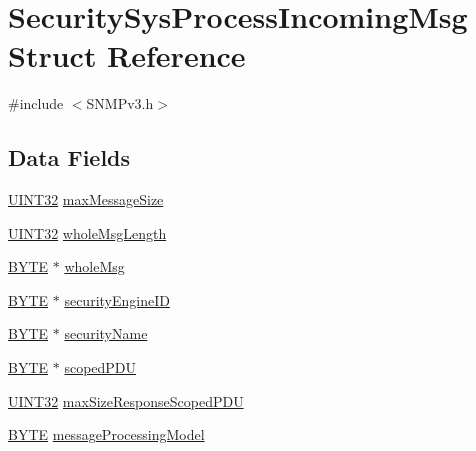 \hypertarget{struct_security_sys_process_incoming_msg}{}\section{Security\+Sys\+Process\+Incoming\+Msg Struct Reference}
\label{struct_security_sys_process_incoming_msg}


{\ttfamily \#include $<$S\+N\+M\+Pv3.\+h$>$}

\subsection*{Data Fields}
\begin{DoxyCompactItemize}
\item 
\hyperlink{_generic_type_defs_8h_a1720f33f59b583f0c2ed071815623a86}{U\+I\+N\+T32} \hyperlink{struct_security_sys_process_incoming_msg_a4bb188cbbe1cd83f7bba86b6ad7ab509}{max\+Message\+Size}
\item 
\hyperlink{_generic_type_defs_8h_a1720f33f59b583f0c2ed071815623a86}{U\+I\+N\+T32} \hyperlink{struct_security_sys_process_incoming_msg_ae69530a979f1b7b71b437d128ffc63ff}{whole\+Msg\+Length}
\item 
\hyperlink{_generic_type_defs_8h_a4ae1dab0fb4b072a66584546209e7d58}{B\+Y\+T\+E} $\ast$ \hyperlink{struct_security_sys_process_incoming_msg_a004e34c44705bf128556c60cca7a6586}{whole\+Msg}
\item 
\hyperlink{_generic_type_defs_8h_a4ae1dab0fb4b072a66584546209e7d58}{B\+Y\+T\+E} $\ast$ \hyperlink{struct_security_sys_process_incoming_msg_a51bb3d3b4289b68feb6ae97ffe038fc3}{security\+Engine\+I\+D}
\item 
\hyperlink{_generic_type_defs_8h_a4ae1dab0fb4b072a66584546209e7d58}{B\+Y\+T\+E} $\ast$ \hyperlink{struct_security_sys_process_incoming_msg_a4a48a8746988a1f761c3e9eadcc20463}{security\+Name}
\item 
\hyperlink{_generic_type_defs_8h_a4ae1dab0fb4b072a66584546209e7d58}{B\+Y\+T\+E} $\ast$ \hyperlink{struct_security_sys_process_incoming_msg_ab8f251f6cafeb71d641a1019102bca43}{scoped\+P\+D\+U}
\item 
\hyperlink{_generic_type_defs_8h_a1720f33f59b583f0c2ed071815623a86}{U\+I\+N\+T32} \hyperlink{struct_security_sys_process_incoming_msg_a4d30d65bba90a70a4606761f5ff3d17d}{max\+Size\+Response\+Scoped\+P\+D\+U}
\item 
\hyperlink{_generic_type_defs_8h_a4ae1dab0fb4b072a66584546209e7d58}{B\+Y\+T\+E} \hyperlink{struct_security_sys_process_incoming_msg_a47f1a1b8f7a3fe5623fe37df094ac032}{message\+Processing\+Model}

\end{DoxyCompactItemize}
